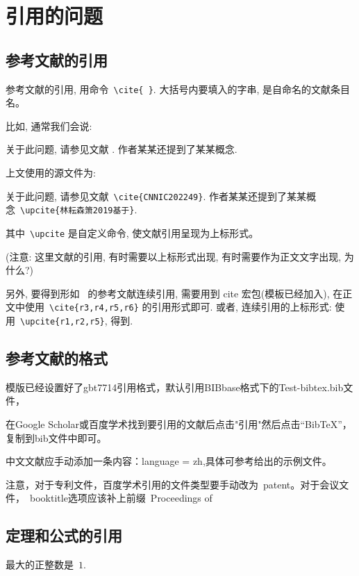 \documentclass[smd,entitle,forlib,AutoFakeBold]{NJTECHMaster}
\begin{document}
\section{引用的问题}


\subsection{参考文献的引用}
参考文献的引用, 用命令~\verb|\cite{ }|. 大括号内要填入的字串, 是自命名的文献条目名。

比如, 通常我们会说:

{\kaishu
	关于此问题, 请参见文献 \cite{CNNIC202249}. 作者某某还提到了某某概念.}


上文使用的源文件为:

{\kaishu
	关于此问题, 请参见文献~\verb|\cite{CNNIC202249}|. 作者某某还提到了某某概念~\verb|\upcite{林耘森箫2019基于}|.
}

其中~\verb|\upcite| 是自定义命令, 使文献引用呈现为上标形式。

({\heiti 注意:} {\kaishu 这里文献的引用, 有时需要以上标形式出现, 有时需要作为正文文字出现, 为什么?})

另外, 要得到形如~\cite{广西壮族自治区林业厅1993广西自然保护区,du2016overview,2018SYSTEMS,陈俊2020基于} 的参考文献连续引用, 需要用到 cite 宏包(模板已经加入),
在正文中使用~\verb|\cite{r3,r4,r5,r6}| 的引用形式即可.
或者, 连续引用的上标形式: 使用~\verb|\upcite{r1,r2,r5}|, 得到.

\subsection{参考文献的格式}
模版已经设置好了gbt7714引用格式，默认引用BIBbase格式下的Test-bibtex.bib文件，

在Google Scholar或百度学术找到要引用的文献后点击"引用"然后点击“BibTeX”，复制到bib文件中即可。

中文文献应手动添加一条内容：language = {zh},具体可参考给出的示例文件。

注意，对于专利文件，百度学术引用的文件类型要手动改为~patent。对于会议文件，~booktitle选项应该补上前缀~Proceedings of


\subsection{定理和公式的引用}

\begin{theorem}[谁发现的]\label{th-abcd}
	最大的正整数是~$1$.
\end{theorem}
\end{document}
